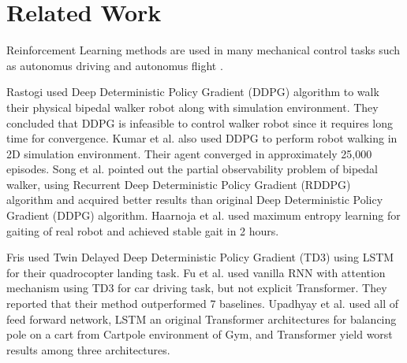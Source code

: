 \section{Related Work}
\label{sec:related_work}

Reinforcement Learning methods are used in many mechanical control tasks 
such as autonomus driving \cite{pan_virtual_2017, shalev-shwartz_safe_2016, sallab_deep_2017, wang_deep_2019} 
and autonomus flight \cite{kopsa_reinforcement_2018, abbeel_application_2006, santos_experimental_2012}.

Rastogi \cite{rastogi_deep_2017} used Deep Deterministic Policy Gradient (DDPG) algorithm to walk 
their physical bipedal walker robot along with simulation environment. 
They concluded that DDPG is infeasible to control walker robot 
since it requires long time for convergence. 
Kumar et al. \cite{kumar_bipedal_2018} also used DDPG to perform 
robot walking in 2D simulation environment. 
Their agent converged in approximately 25,000 episodes. 
Song et al. \cite{song_recurrent_2018} pointed out the partial observability problem of bipedal walker, 
using Recurrent Deep Deterministic Policy Gradient (RDDPG)~\cite{heess_memory-based_2015} algorithm 
and acquired better results than original Deep Deterministic Policy Gradient (DDPG) algorithm. 
Haarnoja et al. \cite{haarnoja_learning_2019} used maximum entropy learning for gaiting of real robot and achieved stable gait in 2 hours. 

Fris \cite{fris_landing_2020} used Twin Delayed Deep Deterministic Policy Gradient (TD3) 
using LSTM for their quadrocopter landing task. 
Fu et al. \cite{fu_when_2020} used vanilla RNN with attention mechanism 
using TD3 for car driving task, but not explicit Transformer. 
They reported that their method outperformed 7 baselines. 
Upadhyay et al. \cite{upadhyay_transformer_2019} used all of feed forward network, 
LSTM an original Transformer architectures for balancing pole 
on a cart from Cartpole environment of Gym, and Transformer yield worst results among three architectures.
